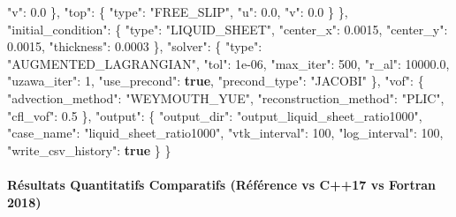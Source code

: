 \documentclass[
  10pt,
]{article}
\newenvironment{Shaded}{}{}
\newcommand{\DataTypeTok}[1]{\textcolor[rgb]{0.56,0.13,0.00}{#1}}
\newcommand{\DecValTok}[1]{\textcolor[rgb]{0.25,0.63,0.44}{#1}}
\newcommand{\FloatTok}[1]{\textcolor[rgb]{0.25,0.63,0.44}{#1}}
\newcommand{\FunctionTok}[1]{\textcolor[rgb]{0.02,0.16,0.49}{#1}}
\newcommand{\KeywordTok}[1]{\textcolor[rgb]{0.00,0.44,0.13}{\textbf{#1}}}
\newcommand{\StringTok}[1]{\textcolor[rgb]{0.25,0.44,0.63}{#1}}
\begin{document}
\begin{Shaded}
\begin{Highlighting}[]
      \DataTypeTok{"v"}\FunctionTok{:} \FloatTok{0.0}
    \FunctionTok{\},}
    \DataTypeTok{"top"}\FunctionTok{:} \FunctionTok{\{}
      \DataTypeTok{"type"}\FunctionTok{:} \StringTok{"FREE\_SLIP"}\FunctionTok{,}
      \DataTypeTok{"u"}\FunctionTok{:} \FloatTok{0.0}\FunctionTok{,}
      \DataTypeTok{"v"}\FunctionTok{:} \FloatTok{0.0}
    \FunctionTok{\}}
  \FunctionTok{\},}
  \DataTypeTok{"initial\_condition"}\FunctionTok{:} \FunctionTok{\{}
    \DataTypeTok{"type"}\FunctionTok{:} \StringTok{"LIQUID\_SHEET"}\FunctionTok{,}
    \DataTypeTok{"center\_x"}\FunctionTok{:} \FloatTok{0.0015}\FunctionTok{,}
    \DataTypeTok{"center\_y"}\FunctionTok{:} \FloatTok{0.0015}\FunctionTok{,}
    \DataTypeTok{"thickness"}\FunctionTok{:} \FloatTok{0.0003}
  \FunctionTok{\},}
  \DataTypeTok{"solver"}\FunctionTok{:} \FunctionTok{\{}
    \DataTypeTok{"type"}\FunctionTok{:} \StringTok{"AUGMENTED\_LAGRANGIAN"}\FunctionTok{,}
    \DataTypeTok{"tol"}\FunctionTok{:} \DecValTok{1e{-}06}\FunctionTok{,}
    \DataTypeTok{"max\_iter"}\FunctionTok{:} \DecValTok{500}\FunctionTok{,}
    \DataTypeTok{"r\_al"}\FunctionTok{:} \FloatTok{10000.0}\FunctionTok{,}
    \DataTypeTok{"uzawa\_iter"}\FunctionTok{:} \DecValTok{1}\FunctionTok{,}
    \DataTypeTok{"use\_precond"}\FunctionTok{:} \KeywordTok{true}\FunctionTok{,}
    \DataTypeTok{"precond\_type"}\FunctionTok{:} \StringTok{"JACOBI"}
  \FunctionTok{\},}
  \DataTypeTok{"vof"}\FunctionTok{:} \FunctionTok{\{}
    \DataTypeTok{"advection\_method"}\FunctionTok{:} \StringTok{"WEYMOUTH\_YUE"}\FunctionTok{,}
    \DataTypeTok{"reconstruction\_method"}\FunctionTok{:} \StringTok{"PLIC"}\FunctionTok{,}
    \DataTypeTok{"cfl\_vof"}\FunctionTok{:} \FloatTok{0.5}
  \FunctionTok{\},}
  \DataTypeTok{"output"}\FunctionTok{:} \FunctionTok{\{}
    \DataTypeTok{"output\_dir"}\FunctionTok{:} \StringTok{"output\_liquid\_sheet\_ratio1000"}\FunctionTok{,}
    \DataTypeTok{"case\_name"}\FunctionTok{:} \StringTok{"liquid\_sheet\_ratio1000"}\FunctionTok{,}
    \DataTypeTok{"vtk\_interval"}\FunctionTok{:} \DecValTok{100}\FunctionTok{,}
    \DataTypeTok{"log\_interval"}\FunctionTok{:} \DecValTok{100}\FunctionTok{,}
    \DataTypeTok{"write\_csv\_history"}\FunctionTok{:} \KeywordTok{true}
  \FunctionTok{\}}
\FunctionTok{\}}
\end{Highlighting}
\end{Shaded}

\paragraph{Résultats Quantitatifs Comparatifs (Référence vs C++17 vs
Fortran
2018)}\label{ruxe9sultats-quantitatifs-comparatifs-ruxe9fuxe9rence-vs-c17-vs-fortran-2018-15}
\end{document}
